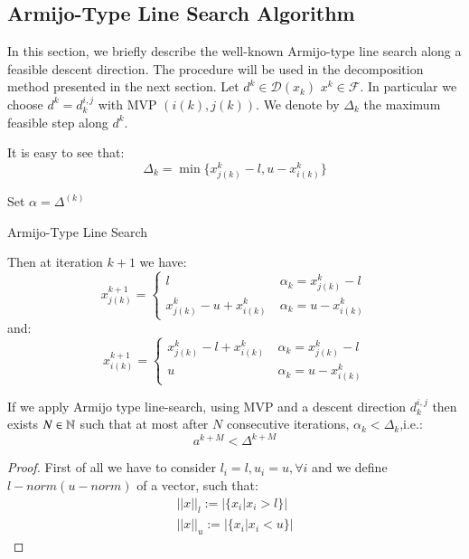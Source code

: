 \subsection{Armijo-Type Line Search Algorithm}
In this section, we briefly describe the well-known Armijo-type line search along a feasible descent direction. The procedure will be used in the decomposition method presented in the next section. 
Let $d^{k} \in \mathcal{D}(x_k)$  $x^{k} \in \mathcal{F}$. In particular we choose $d^{k}=d^{i,j}_k$ with MVP $(i(k),j(k))$.
We denote by $\Delta_{k}$ the maximum feasible step along $d^{k}$. 

It is easy to see that:
\begin{equation*}
\Delta_k=\min \{ x^k_{j(k)}-l, u-x^k_{i(k)}\}
\end{equation*}
\begin{algorithm}[ht]
 Set $\alpha = \Delta^{(k)}$\\
 \caption{Armijo-Type Line Search}
\end{algorithm}

Then at iteration $k+1$ we have:
\begin{equation*}
x^{k+1}_{j(k)}=\begin{cases}
 l \ &\alpha_k=x^k_{j(k)}-l\\
 x^k_{j(k)}-u+x^k_{i(k)} \ &\alpha_k=u-x^k_{i(k)}
 \end{cases}
\end{equation*}
and:
\begin{equation*}
x^{k+1}_{i(k)}=\begin{cases}
 x^k_{j(k)}-l+x^k_{i(k)} \ &\alpha_k=x^k_{j(k)}-l\\
 u \ &\alpha_k=u-x^k_{i(k)}
 \end{cases}
\end{equation*}




\begin{proposition}\label{proposition:david}
 If we apply Armijo type line-search, using MVP and a descent direction $d_k^{i,j}$ then exists $N \in \mathbb{N}$ such that at most after $N$ consecutive iterations, $\alpha_k<\Delta_k$,i.e.:
 \begin{equation}
  a^{k+M}<\Delta^{k+M}
 \end{equation}
\end{proposition}
\begin{proof}
First of all we have to consider $l_i = l, u_i=u, \forall i$ and we define $l-norm (u-norm)$ of a vector, such that:
\begin{equation*}
\begin{aligned}
 ||x||_l:= |\{x_i| x_i >l\}| \\
 ||x||_u:= |\{x_i| x_i <u\}| 
 \end{aligned}
\end{equation*}
\end{proof}

